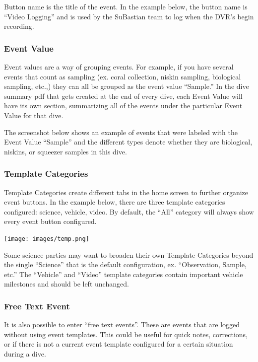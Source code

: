 \documentclass[
  letterpaper,
  DIV=11,
  numbers=noendperiod]{scrreprt}
\begin{document}
Button name is the title of the event. In the example below, the button
name is ``Video Logging'' and is used by the SuBastian team to log when
the DVR's begin recording.

\hypertarget{event-value}{%
\subsubsection{Event Value}\label{event-value}}

Event values are a way of grouping events. For example, if you have
several events that count as sampling (ex. coral collection, niskin
sampling, biological sampling, etc.,) they can all be grouped as the
event value ``Sample.'' In the dive summary pdf that gets created at the
end of every dive, each Event Value will have its own section,
summarizing all of the events under the particular Event Value for that
dive.

The screenshot below shows an example of events that were labeled with
the Event Value ``Sample'' and the different types denote whether they
are biological, niskins, or squeezer samples in this dive.

\hypertarget{template-categories}{%
\subsubsection{Template Categories}\label{template-categories}}

Template Categories create different tabs in the home screen to further
organize event buttons. In the example below, there are three template
categories configured: science, vehicle, video. By default, the ``All''
category will always show every event button configured.

\texttt{[image: images/temp.png]}

Some science parties may want to broaden their own Template Categories
beyond the single ``Science'' that is the default configuration, ex.
``Observation, Sample, etc.'' The ``Vehicle'' and ``Video'' template
categories contain important vehicle milestones and should be left
unchanged.

\hypertarget{free-text-event}{%
\subsubsection{Free Text Event}\label{free-text-event}}

It is also possible to enter ``free text events''. These are events that
are logged without using event templates. This could be useful for quick
notes, corrections, or if there is not a current event template
configured for a certain situation during a dive.
\end{document}
